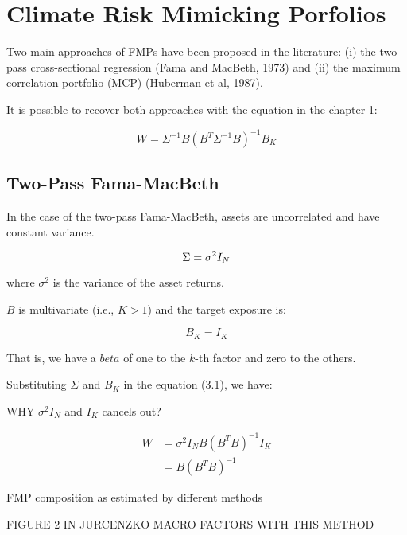 \chapter{Climate Risk Mimicking Porfolios}
 
Two main approaches of FMPs 
have been proposed in the literature: 
(i) the two-pass cross-sectional regression (Fama and MacBeth, 1973) and
(ii) the maximum correlation portfolio (MCP) (Huberman et al, 1987).

It is possible to recover both approaches
with the equation in the chapter 1:

\begin{equation}
    W = \Sigma^{-1} B (B^T \Sigma^{-1} B)^{-1} B_K
\end{equation}


\section{Two-Pass Fama-MacBeth}

In the case of the two-pass Fama-MacBeth,
assets are uncorrelated and have constant variance.

\begin{equation}
        \Sigma = \sigma^2 I_N \\
\end{equation}

where $\sigma^2$ is the variance of the asset returns.

$B$ is multivariate (i.e., $K > 1$) and the 
target exposure is:

\begin{equation}
    B_K = I_K 
\end{equation}

That is, we have a $beta$ of one to the $k$-th factor and 
zero to the others.

Substituting $\Sigma$ and $B_K$ in the equation (3.1), we have:


WHY $\sigma^2 I_N$ and $I_K$ cancels out?

\begin{equation}
    \begin{aligned}
        W &= {\sigma^2}I_N B (B^T B)^{-1} I_K \\
        &= B (B^T B)^{-1}
    \end{aligned}
\end{equation}


FMP composition as estimated by different methods

FIGURE 2 IN JURCENZKO MACRO FACTORS WITH THIS METHOD

